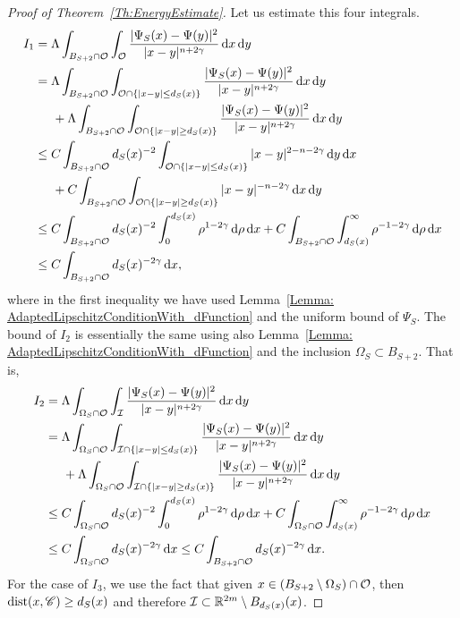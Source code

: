 \begin{proof}[Proof of Theorem~\ref{Th:EnergyEstimate}]
Let us estimate this four integrals. 
\begin{align*}
I_1 &= \Lambda \int_{B_{S+2} \cap \mathcal{O}} \int_{\mathcal{O}} \frac{|\Psi_S(x)-\Psi(y)|^2}{|x-y|^{n+2\gamma}} \,\mathrm{d} x\,\mathrm{d} y\\
&= \Lambda \int_{B_{S+2} \cap \mathcal{O}} \int_{\mathcal{O}\cap\{|x-y|\leq d_S(x)\}} \frac{|\Psi_S(x)-\Psi(y)|^2}{|x-y|^{n+2\gamma}} \,\mathrm{d} x\,\mathrm{d} y\\
&\hspace{5mm} + \Lambda \int_{B_{S+2} \cap \mathcal{O}} \int_{\mathcal{O}\cap\{|x-y|\geq d_S(x)\}} \frac{|\Psi_S(x)-\Psi(y)|^2}{|x-y|^{n+2\gamma}} \,\mathrm{d} x\,\mathrm{d} y\\
&\leq C \int_{B_{S+2} \cap \mathcal{O}} d_S(x)^{-2}\int_{\mathcal{O}\cap\{|x-y|\leq d_S(x)\}} |x-y|^{2-n-2\gamma} \,\mathrm{d} y\,\mathrm{d} x\\
&\hspace{5mm} + C \int_{B_{S+2} \cap \mathcal{O}} \int_{\mathcal{O}\cap\{|x-y|\geq d_S(x)\}} |x-y|^{-n-2\gamma} \,\mathrm{d} x\,\mathrm{d} y\\
&\leq C \int_{B_{S+2} \cap \mathcal{O}} d_S(x)^{-2}\int_0^{d_S(x)} \rho^{1-2\gamma} \,\mathrm{d} \rho\,\mathrm{d} x + C \int_{B_{S+2} \cap \mathcal{O}}  \int_{d_S(x)}^\infty \rho^{-1-2\gamma} \,\mathrm{d}\rho \,\mathrm{d} x\\
&\leq C \int_{B_{S+2} \cap \mathcal{O}} d_S(x)^{-2\gamma} \,\mathrm{d} x,
\end{align*}
where in the first inequality we have used Lemma~\ref{Lemma: AdaptedLipschitzConditionWith_dFunction} and the uniform bound of $\Psi_S$. The bound of $I_2$ is essentially the same using also Lemma~\ref{Lemma: AdaptedLipschitzConditionWith_dFunction} and the inclusion $\Omega_S \subset B_{S+2}$. That is,
\begin{align*}
I_2 &= \Lambda \int_{\Omega_S \cap \mathcal{O}} \int_{\mathcal{I}} \frac{|\Psi_S(x)-\Psi(y)|^2}{|x-y|^{n+2\gamma}} \,\mathrm{d} x\,\mathrm{d} y\\
&= \Lambda \int_{\Omega_S \cap \mathcal{O}} \int_{\mathcal{I}\cap\{|x-y|\leq d_S(x)\}} \frac{|\Psi_S(x)-\Psi(y)|^2}{|x-y|^{n+2\gamma}} \,\mathrm{d} x\,\mathrm{d} y\\
&\hspace{5mm} + \Lambda \int_{\Omega_S \cap \mathcal{O}} \int_{\mathcal{I}\cap\{|x-y|\geq d_S(x)\}} \frac{|\Psi_S(x)-\Psi(y)|^2}{|x-y|^{n+2\gamma}} \,\mathrm{d} x\,\mathrm{d} y\\
&\leq C \int_{\Omega_S \cap \mathcal{O}} d_S(x)^{-2}\int_0^{d_S(x)} \rho^{1-2\gamma} \,\mathrm{d} \rho\,\mathrm{d} x + C \int_{\Omega_S \cap \mathcal{O}}  \int_{d_S(x)}^\infty \rho^{-1-2\gamma} \,\mathrm{d}\rho \,\mathrm{d} x\\
&\leq C \int_{\Omega _S\cap \mathcal{O}} d_S(x)^{-2\gamma} \,\mathrm{d} x \leq C \int_{B_{S+2} \cap \mathcal{O}} d_S(x)^{-2\gamma} \,\mathrm{d} x.
\end{align*}
For the case of $I_3$, we use the fact that given $x\in (B_{S+2}\setminus \Omega_S)\cap \mathcal{O}$, then $\operatorname{dist}(x,\mathscr{C})\geq d_S(x)$ and therefore $\mathcal{I} \subset \mathbb{R}^{2m}\setminus B_{d_S(x)}(x)$.

\end{proof}
